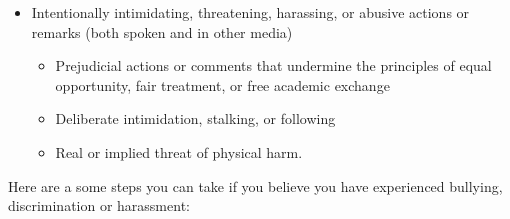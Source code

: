 \documentclass[]{book}
\providecommand{\tightlist}{%
  \setlength{\itemsep}{0pt}\setlength{\parskip}{0pt}}
\begin{document}
\begin{itemize}
\tightlist
\item
  Intentionally intimidating, threatening, harassing, or abusive actions or remarks (both spoken and in other media)

  \begin{itemize}
  \tightlist
  \item
    Prejudicial actions or comments that undermine the principles of equal opportunity, fair treatment, or free academic exchange
  \item
    Deliberate intimidation, stalking, or following
  \item
    Real or implied threat of physical harm.
  \end{itemize}
\end{itemize}

Here are a some steps you can take if you believe you have experienced bullying, discrimination or harassment:
\end{document}
